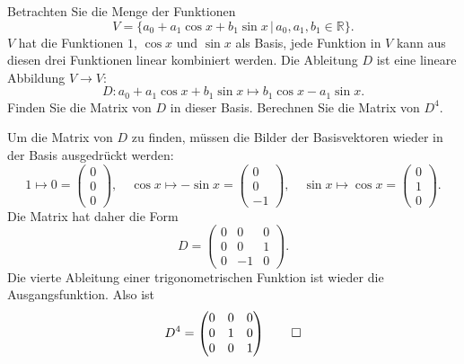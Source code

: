 Betrachten Sie die Menge der Funktionen
\[
V=\{
a_0+a_1\cos x+b_1\sin x\,|\,a_0,a_1,b_1\in\mathbb R\}.
\]
$V$ hat die Funktionen $1$, $\cos x$ und $\sin x$ als Basis,
jede Funktion in $V$ kann aus diesen drei Funktionen linear
kombiniert werden.
Die Ableitung $D$ ist eine lineare Abbildung $V\to V$:
\[
D:a_0+a_1\cos x+b_1\sin x\mapsto b_1\cos x -a_1\sin x.
\]
Finden Sie die Matrix von $D$ in dieser Basis. Berechnen Sie
die Matrix von $D^4$.

\begin{loesung}
Um die Matrix von $D$ zu finden, müssen die Bilder der
Basisvektoren wieder in der Basis ausgedrückt werden:
\[
1\mapsto 0=\begin{pmatrix}0\\0\\0\end{pmatrix},\quad
\cos x\mapsto -\sin x=\begin{pmatrix}0\\0\\-1\end{pmatrix},\quad
\sin x\mapsto \cos x=\begin{pmatrix}0\\1\\0\end{pmatrix}.
\]
Die Matrix hat daher die Form
\[
D=\begin{pmatrix}
0&0&0\\
0&0&1\\
0&-1&0
\end{pmatrix}.
\]
Die vierte Ableitung einer trigonometrischen Funktion ist wieder
die Ausgangsfunktion. Also ist
\[
D^4=\begin{pmatrix}
0&0&0\\
0&1&0\\
0&0&1
\end{pmatrix}
\qedhere
\]
\end{loesung}

